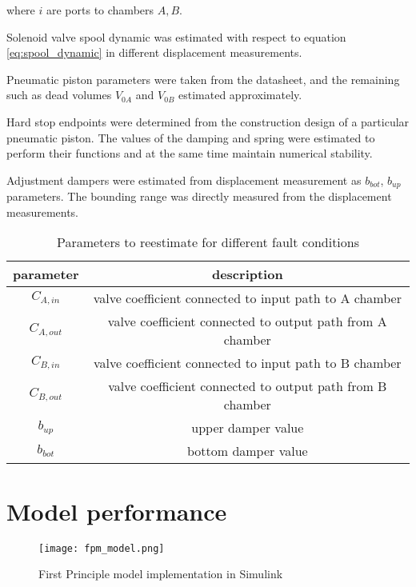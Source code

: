 where $i$ are ports to chambers $A, B$.


Solenoid valve spool dynamic was estimated with respect to equation
\ref{eq:spool_dynamic}
in different displacement measurements. 

Pneumatic piston parameters were taken from the datasheet, and the remaining
such as dead volumes $V_{0A}$ and $V_{0B}$ estimated approximately.

Hard stop endpoints were determined from the construction design of a
particular pneumatic piston. The values of the damping and spring were
estimated to perform their functions and at the same time maintain
numerical stability.

Adjustment dampers were estimated from displacement measurement as $b_{bot}$,
$b_{up}$ parameters. The bounding range was directly measured from the
displacement measurements.

\begin{table}[h]
    \centering
    \begin{tabular}{|c|c|}
        \hline
        \textbf{parameter} & \textbf{description}  \\
        \hline
        $C_{A,in}$      & valve coefficient connected to input path to  A chamber \\
        $C_{A,out}$  & valve coefficient connected to output path from A chamber \\
        $C_{B,in}$      & valve coefficient connected to input path to  B chamber \\
        $C_{B,out}$  & valve coefficient connected to output path from B chamber \\
        $b_{up}$        & upper damper value  \\
        $b_{bot}$       & bottom damper value \\
        \hline
    \end{tabular}
    \caption{Parameters to reestimate for different fault conditions}
    \label{tab:est_params}
\end{table}

\newpage
\section{Model performance}

\begin{figure}[h!]
    \centering
    \texttt{[image: fpm\_model.png]}
    \caption{First Principle model implementation in Simulink}
    \label{fig:fpm_simulink}
\end{figure}

